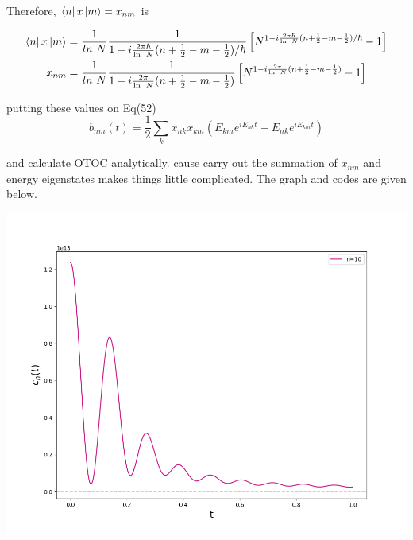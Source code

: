 \documentclass[12pt]{report}
\newcommand*{\1}{\hspace{1pt}}
\begin{document}
        Therefore, $\bra{n}x\ket{m}=x_{nm}$ is

        \begin{align}
            \bra{n}x\ket{m} &= \frac{1}{ln \ N} \frac{1}{1-i\frac{2\pi \hbar}{\ln \ N}(n + \frac{1}{2}-m-\frac{1}{2})/\hbar}\left[N^{1-i\frac{2\pi \hbar}{\ln \ N}(n + \frac{1}{2}-m-\frac{1}{2})/\hbar} - 1\right] \\
            x_{nm}&= \frac{1}{ln \ N} \frac{1}{1-i\frac{2\pi}{\ln \ N}(n + \frac{1}{2}-m-\frac{1}{2})}\left[N^{1-i\frac{2\pi}{\ln \ N}(n + \frac{1}{2}-m-\frac{1}{2})} - 1\right]
        \end{align}

        putting these values on Eq(52)
        \begin{equation*}
            b_{nm}(t) = \frac{1}{2}\sum_{k} x_{nk}x_{km}(E_{km}e^{i E _{nk}t} - E_{nk}e^{iE_{km}t}) 
        \end{equation*}

        and calculate OTOC analytically. cause carry out the summation of $x_{nm}$ and energy eigenstates makes things little complicated. The graph and codes are given below.

        \begin{adjustbox}{center,caption={},label={microcanocnial OTOC},nofloat=figure,}
            \includegraphics[width=\textwidth]{pic1}
        \end{adjustbox}
\end{document}
